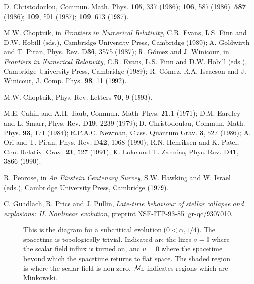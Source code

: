 \begin{references}

 D. Christodoulou, Commun. Math. Phys. {\bf 105}, 337 (1986);
                {\bf 106}, 587 (1986); {\bf 587} (1986); {\bf 109}, 591 (1987);
                {\bf 109}, 613 (1987).

 M.W. Choptuik, in {\em Frontiers in Numerical Relativity}, C.R.
                Evans, L.S. Finn and D.W. Hobill (eds.), Cambridge University
                Press,  Cambridge (1989);  A. Goldwirth and T. Piran, Phys.
		Rev.
                D{\bf 36}, 3575 (1987); R. G\'omez and J. Winicour,  in {\em
                 Frontiers in Numerical Relativity}, C.R.
                Evans, L.S. Finn and D.W. Hobill (eds.), Cambridge University
                Press,  Cambridge (1989);   R. G\'omez, R.A. Isaacson
                and J. Winicour,  J. Comp. Phys. {\bf 98}, 11 (1992).

 M.W. Choptuik, Phys. Rev. Letters {\bf 70}, 9 (1993).



 M.E. Cahill and A.H. Taub,  Commun. Math. Phys. {\bf 21},1
                (1971);  D.M. Eardley and L. Smarr,  Phys. Rev. D{\bf 19}, 2239
                (1979);  D. Christodoulou,  Commun. Math. Phys. {\bf 93},
                171 (1984); R.P.A.C. Newman, Class. Quantum Grav. {\bf 3}, 527
                (1986);
                A. Ori and T. Piran, Phys. Rev. D{\bf 42}, 1068 (1990);
                R.N. Henriksen and K. Patel, Gen. Relativ. Grav. {\bf 23}, 527
                (1991);  K.  Lake and T. Zannias,  Phys. Rev. D{\bf 41}, 3866
                (1990).

 R. Penrose,  in {\em An Einstein Centenary Survey}, S.W.
                 Hawking and W. Israel (eds.),  Cambridge University Press,
                  Cambridge (1979).

 C. Gundlach, R. Price and J. Pullin, {\em Late-time behaviour
of
stellar collapse and explosions: II.  Nonlinear evolution},  preprint
NSF-ITP-93-85,  gr-qc/9307010.

\end{references}


\begin{figure}

\caption{  This is the diagram for a subcritical evolution ($0<\alpha,1/4$).
The spacetime is topologically trivial.  Indicated are the lines $v=0$ where
the scalar field influx is turned on, and $u=0$ where the spacetime beyond
which the spacetime returns to flat space.  The shaded region is where the
scalar field is non-zero.  ${\cal M}_4$ indicates regions which are Minkowski.}
\end{figure}


